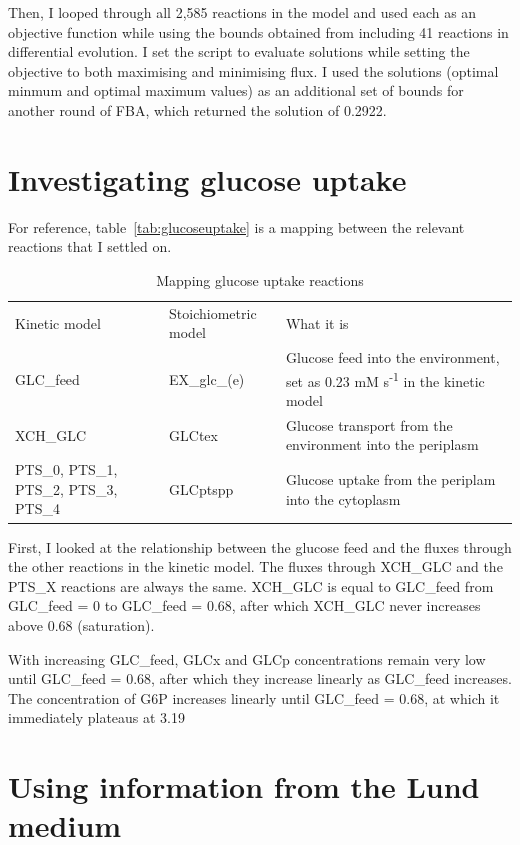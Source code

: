\documentclass[parskip=full]{scrreprt}
\begin{document}
Then, I looped through all 2,585 reactions in the model and used each as an objective function while using the bounds obtained from including 41 reactions in differential evolution. I set the script to evaluate solutions while setting the objective to both maximising and minimising flux. I used the solutions (optimal minmum and optimal maximum values) as an additional set of bounds for another round of FBA, which returned the solution of 0.2922.

\section{Investigating glucose uptake}
\label{sec:glucoseuptake}

For reference, table~\vref{tab:glucoseuptake} is a mapping between the relevant reactions that I settled on.

\begin{table}
  \caption{Mapping glucose uptake reactions}
  \label{tab:glucoseuptake}
  \centering
  \begin{tabularx}{\linewidth}{LLL}
    Kinetic model & Stoichiometric model & What it is\\
    GLC\_feed & EX\_glc\_(e) & Glucose feed into the environment, set as 0.23 mM s\textsuperscript{-1} in the kinetic model\\
    XCH\_GLC & GLCtex & Glucose transport from the environment into the periplasm\\
    PTS\_0, PTS\_1, PTS\_2, PTS\_3, PTS\_4 & GLCptspp & Glucose uptake from the periplam into the cytoplasm\\
  \end{tabularx}
\end{table}

First, I looked at the relationship between the glucose feed and the fluxes through the other reactions in the kinetic model. The fluxes through XCH\_GLC and the PTS\_X reactions are always the same. XCH\_GLC is equal to GLC\_feed from GLC\_feed = 0 to GLC\_feed = 0.68, after which XCH\_GLC never increases above 0.68 (saturation).

With increasing GLC\_feed, GLCx and GLCp concentrations remain very low until GLC\_feed = 0.68, after which they increase linearly as GLC\_feed increases. The concentration of G6P increases linearly until GLC\_feed = 0.68, at which it immediately plateaus at 3.19

\section{Using information from the Lund medium}
\label{sec:lund}
\end{document}

